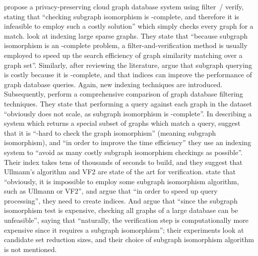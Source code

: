 \documentclass[twoside,11pt]{article}
\begin{document}
 propose a privacy-preserving cloud graph database system using
filter~/ verify, stating that ``checking subgraph isomorphism is \NP-complete, and therefore it is
infeasible to employ such a costly solution'' which simply checks every graph for a match.
 look at indexing large sparse graphs. They state that ``because
subgraph isomorphism is an \NP-complete problem, a filter-and-verification method is usually
employed to speed up the search efficiency of graph similarity matching over a graph set''.
Similarly, after reviewing the literature,  argue that subgraph
querying is costly because it is \NP-complete, and that indices can improve the performance of graph
database queries. Again, new indexing techniques are introduced. Subsequently,
 perform a comprehensive comparison of graph database
filtering techniques. They state that performing a query against each graph in the dataset
``obviously does not scale, as subgraph isomorphism is \NP-complete''. In describing a system which
returns a special subset of graphs which match a query, 
suggest that it is ``\NP-hard to check the graph isomorphism'' (meaning subgraph isomorphism), and
``in order to improve the time efficiency'' they use an indexing system to ``avoid as many costly
subgraph isomorphism checkings as possible''. Their index takes tens of thousands of seconds to
build, and they suggest that Ullmann's algorithm and VF2 are state of the art for verification.
 state that ``obviously, it is impossible to employ some
subgraph isomorphism algorithm, such as Ullmann or VF2'', and argue that ``in order to speed up
query processing'', they need to create indices.  And  argue that
``since the subgraph isomorphism test is expensive, checking all graphs of a large database can be
unfeasible'', saying that ``naturally, the verification step is computationally more expensive since
it requires a subgraph isomorphism''; their experiments look at candidate set reduction sizes, and
their choice of subgraph isomorphism algorithm is not mentioned.
\end{document}

